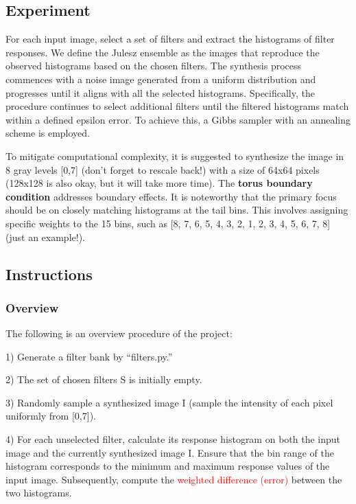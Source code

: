 \documentclass[11pt]{article}
\begin{document}
\subsection{Experiment}

For each input image, select a set of filters and extract the histograms of filter responses. We define the Julesz ensemble as the images that reproduce the observed histograms based on the chosen filters. The synthesis process commences with a noise image generated from a uniform distribution and progresses until it aligns with all the selected histograms. Specifically, the procedure continues to select additional filters until the filtered histograms match within a defined epsilon error. To achieve this, a Gibbs sampler with an annealing scheme is employed. 

To mitigate computational complexity, it is suggested to synthesize the image in 8 gray levels {[}0,7{]} (don't forget to rescale back!) with a size of 64x64 pixels (128x128 is also okay, but it will take more time). The \textbf{torus boundary condition} addresses boundary effects. It is noteworthy that the primary focus should be on closely matching histograms at the tail bins. This involves assigning specific weights to the 15 bins, such as {[8, 7, 6, 5, 4, 3, 2, 1, 2, 3, 4, 5, 6, 7, 8]} (just an example!).

\subsection{Instructions}

\subsubsection{Overview}\label{subsubsec:overview}

The following is an overview procedure of the project:

1) Generate a filter bank by ``filters.py.''

2) The set of chosen filters S is initially empty.

3) Randomly sample a synthesized image I (sample the intensity of each pixel uniformly from {[}0,7{]}).

4) For each unselected filter, calculate its response histogram on both the input image and the currently synthesized image I. Ensure that the bin range of the histogram corresponds to the minimum and maximum response values of the input image. Subsequently, compute the \textcolor{red}{weighted difference (error)} between the two histograms.
\end{document}
